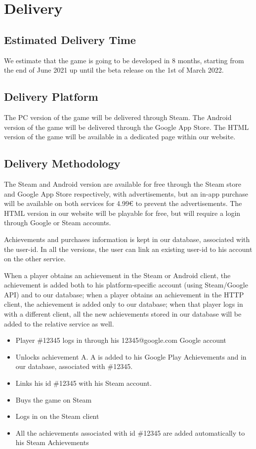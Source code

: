 \section{Delivery}
\subsection{Estimated Delivery Time}
We estimate that the game is going to be developed in 8 months, starting from the end of June 2021 up until the beta release on the 1st of March 2022.

\subsection{Delivery Platform}
The PC      version of the game will be delivered through Steam. 
The Android version of the game will be delivered through the Google App Store.
The HTML    version of the game will be available in a dedicated page within our website.

\subsection{Delivery Methodology}
The Steam and Android version are available for free through the Steam store and Google App Store respectively, with advertisements, but an in-app purchase will be available on both services for 4.99€ to prevent the advertisements.
The HTML version in our website will be playable for free, but will require a login through Google or Steam accounts.

Achievements and purchases information is kept in our database, associated with the user-id. 
In all the versions, the user can link an existing user-id to his account on the other service. 

When a player obtains an achievement in the Steam or Android client, the achievement is added both to his platform-specific account (using Steam/Google API) and to our database; when a player obtains an achievement in the HTTP client, the achievement is added only to our database; when that player logs in with a different client, all the new achievements stored in our database will be added to the relative service as well.


\begin{itemize}
	\item Player \#12345 logs in through his 12345@google.com Google account
	\item Unlocks achievement A. A is added to his Google Play Achievements and in our database, associated with \#12345.
	\item Links his id \#12345 with his Steam account.
	\item Buys the game on Steam
	\item Logs in on the Steam client
	\item All the achievements associated with id \#12345 are added automatically to his Steam Achievements
\end{itemize}

